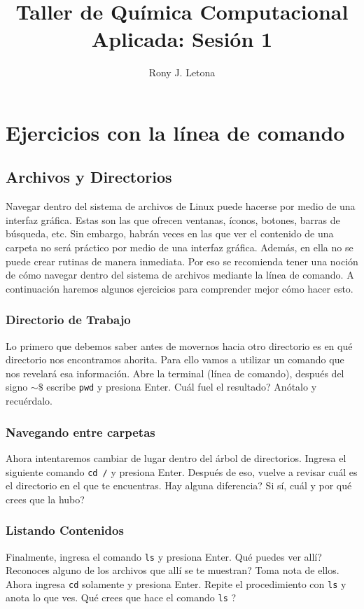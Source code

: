 \documentclass[10pt,letterpaper]{article}
\author{Rony J. Letona}
\title{Taller de Qu\'imica Computacional Aplicada: Sesi\'on 1}
\newcommand{\inlinecode}[1]{
\colorbox{light-gray}{\texttt{#1}}
}
\begin{document}
\maketitle

\section{Ejercicios con la l\'inea de comando}

\subsection{Archivos y Directorios}
Navegar dentro del sistema de archivos de Linux puede hacerse por medio de una interfaz gr\'afica. Estas son las que ofrecen ventanas, \'iconos, botones, barras de b\'usqueda, etc. Sin embargo, habr\'an veces en las que ver el contenido de una carpeta no ser\'a pr\'actico por medio de una interfaz gr\'afica. Adem\'as, en ella no se puede crear rutinas de manera inmediata. Por eso se recomienda tener una noci\'on de c\'omo navegar dentro del sistema de archivos mediante la l\'inea de comando. A continuaci\'on haremos algunos ejercicios para comprender mejor c\'omo hacer esto.

\subsubsection{Directorio de Trabajo}
Lo primero que debemos saber antes de movernos hacia otro directorio es en qu\'e directorio nos encontramos ahorita. Para ello vamos a utilizar un comando que nos revelar\'a esa informaci\'on. Abre la terminal (l\'inea de comando), despu\'es del signo \inlinecode{$\sim\$ $} escribe \inlinecode{pwd} y presiona Enter. Cu\'al fuel el resultado? An\'otalo y recu\'erdalo.

\subsubsection{Navegando entre carpetas}
Ahora intentaremos cambiar de lugar dentro del \'arbol de directorios. Ingresa el siguiente comando \inlinecode{cd /} y presiona Enter. Despu\'es de eso, vuelve a revisar cu\'al es el directorio en el que te encuentras. Hay alguna diferencia? Si s\'i, cu\'al y por qu\'e crees que la hubo?

\subsubsection{Listando Contenidos}
Finalmente, ingresa el comando \inlinecode{ls} y presiona Enter. Qu\'e puedes ver all\'i? Reconoces alguno de los archivos que all\'i se te muestran? Toma nota de ellos. Ahora ingresa \inlinecode{cd} solamente y presiona Enter. Repite el procedimiento con \inlinecode{ls} y anota lo que ves. Qu\'e crees que hace el comando \inlinecode{ls}?
\end{document}
